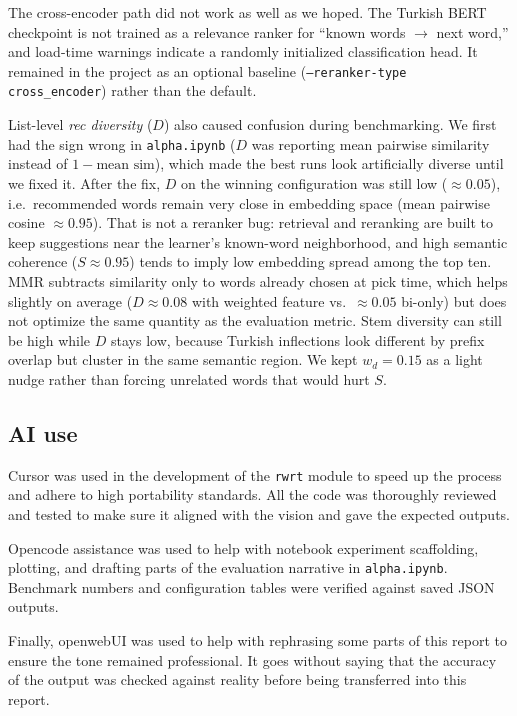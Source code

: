 \documentclass{article}
\begin{document}
The cross-encoder path did not work as well as we hoped. The Turkish BERT checkpoint is not trained as a relevance ranker for ``known words $\rightarrow$ next word,'' and load-time warnings indicate a randomly initialized classification head. It remained in the project as an optional baseline (\texttt{--reranker-type cross\_encoder}) rather than the default.

List-level \textit{rec diversity} ($D$) also caused confusion during benchmarking. We first had the sign wrong in \texttt{alpha.ipynb} ($D$ was reporting mean pairwise similarity instead of $1 - \text{mean sim}$), which made the best runs look artificially diverse until we fixed it. After the fix, $D$ on the winning configuration was still low ($\approx 0.05$), i.e.\ recommended words remain very close in embedding space (mean pairwise cosine $\approx 0.95$). That is not a reranker bug: retrieval and reranking are built to keep suggestions near the learner's known-word neighborhood, and high semantic coherence ($S \approx 0.95$) tends to imply low embedding spread among the top ten. MMR subtracts similarity only to words already chosen at pick time, which helps slightly on average ($D \approx 0.08$ with weighted feature vs.\ $\approx 0.05$ bi-only) but does not optimize the same quantity as the evaluation metric. Stem diversity can still be high while $D$ stays low, because Turkish inflections look different by prefix overlap but cluster in the same semantic region. We kept $w_d = 0.15$ as a light nudge rather than forcing unrelated words that would hurt $S$.

\subsection{AI use}

Cursor was used in the development of the \texttt{rwrt} module to speed up the process and adhere to high portability standards. All the code was thoroughly reviewed and tested to make sure it aligned with the vision and gave the expected outputs.

Opencode assistance was used to help with notebook experiment scaffolding, plotting, and drafting parts of the evaluation narrative in \texttt{alpha.ipynb}. Benchmark numbers and configuration tables were verified against saved JSON outputs.

Finally, openwebUI was used to help with rephrasing some parts of this report to ensure the tone remained professional. It goes without saying that the accuracy of the output was checked against reality before being transferred into this report.
\end{document}
